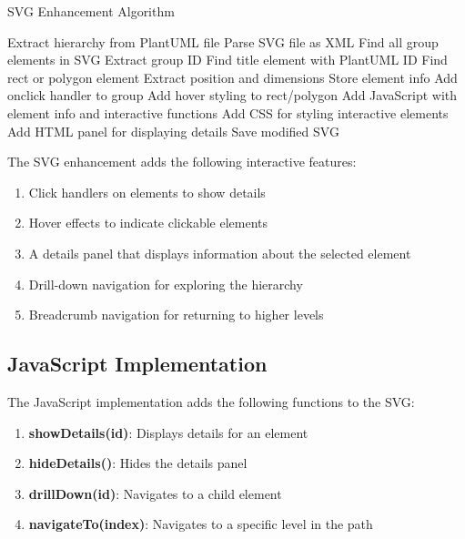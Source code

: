 \documentclass[a4paper,12pt]{article}
\begin{document}
\begin{algorithm}
\caption{SVG Enhancement Algorithm}
\begin{algorithmic}[1]
    \State Extract hierarchy from PlantUML file
    \State Parse SVG file as XML
    \State Find all group elements in SVG
        \State Extract group ID
        \State Find title element with PlantUML ID
            \State Find rect or polygon element
            \State Extract position and dimensions
            \State Store element info
            \State Add onclick handler to group
            \State Add hover styling to rect/polygon
        \EndIf
    \EndFor
    \State Add JavaScript with element info and interactive functions
    \State Add CSS for styling interactive elements
    \State Add HTML panel for displaying details
    \State Save modified SVG
\EndProcedure
\end{algorithmic}
\end{algorithm}

The SVG enhancement adds the following interactive features:
\begin{enumerate}
    \item Click handlers on elements to show details
    \item Hover effects to indicate clickable elements
    \item A details panel that displays information about the selected element
    \item Drill-down navigation for exploring the hierarchy
    \item Breadcrumb navigation for returning to higher levels
\end{enumerate}

\subsection{JavaScript Implementation}

The JavaScript implementation adds the following functions to the SVG:

\begin{enumerate}
    \item \textbf{showDetails(id)}: Displays details for an element
    \item \textbf{hideDetails()}: Hides the details panel
    \item \textbf{drillDown(id)}: Navigates to a child element
    \item \textbf{navigateTo(index)}: Navigates to a specific level in the path
\end{enumerate}
\end{document}
